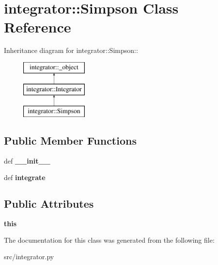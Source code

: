\hypertarget{classintegrator_1_1Simpson}{
\section{integrator::Simpson Class Reference}
\label{d0/d4a/classintegrator_1_1Simpson}
}
Inheritance diagram for integrator::Simpson::\begin{figure}[H]
\begin{center}
\leavevmode
\includegraphics[height=3cm]{d0/d4a/classintegrator_1_1Simpson}
\end{center}
\end{figure}
\subsection*{Public Member Functions}
\begin{DoxyCompactItemize}
\item 
\hypertarget{classintegrator_1_1Simpson_a17d1008804885fc6afe3790365ffa9e7}{
def {\bfseries \_\-\_\-init\_\-\_\-}}
\label{d0/d4a/classintegrator_1_1Simpson_a17d1008804885fc6afe3790365ffa9e7}

\item 
\hypertarget{classintegrator_1_1Simpson_a8af6b307046196ddefc88456f2341b16}{
def {\bfseries integrate}}
\label{d0/d4a/classintegrator_1_1Simpson_a8af6b307046196ddefc88456f2341b16}

\end{DoxyCompactItemize}
\subsection*{Public Attributes}
\begin{DoxyCompactItemize}
\item 
\hypertarget{classintegrator_1_1Simpson_a891a4cebf60a703f96f1bbd8d1add1e2}{
{\bfseries this}}
\label{d0/d4a/classintegrator_1_1Simpson_a891a4cebf60a703f96f1bbd8d1add1e2}

\end{DoxyCompactItemize}


The documentation for this class was generated from the following file:\begin{DoxyCompactItemize}
\item 
src/integrator.py\end{DoxyCompactItemize}
